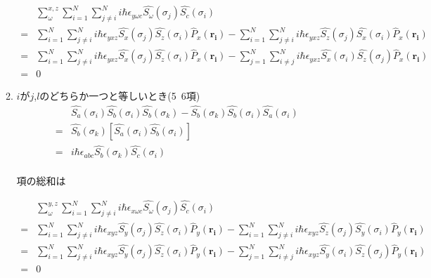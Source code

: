 \documentclass{article}
\begin{document}
\begin{enumerate}
\begin{enumerate}
\begin{equation}
\begin{split}
\label{}
&\sum_{\omega}^{x,z}\sum_{i=1}^{N} \sum_{j\neq i}^{N} i\hbar \epsilon_{y \omega c}\hat{S_{\omega}}{(\sigma_j)} \hat{S_c}(\sigma_i)\\  
=&\sum_{i=1}^{N} \sum_{j\neq i}^{N} i\hbar \epsilon_{y xz}\hat{S_{x}}{(\sigma_j)} \hat{S_z}(\sigma_i) {\hat{P}_x}{(\boldsymbol{r_i})} - \sum_{i=1}^{N} \sum_{j\neq i}^{N} i\hbar \epsilon_{yxz}\hat{S_{z}}{(\sigma_j)} \hat{S_x}(\sigma_i) {\hat{P}_x}{(\boldsymbol{r_i})}\\ 
=&\sum_{i=1}^{N} \sum_{j\neq i}^{N} i\hbar \epsilon_{yxz}\hat{S_{x}}{(\sigma_j)} \hat{S_z}(\sigma_i) {\hat{P}_x}{(\boldsymbol{r_i})} - \sum_{j=1}^{N} \sum_{i\neq j}^{N} i\hbar \epsilon_{yxz}\hat{S_{x}}{(\sigma_i)} \hat{S_z}(\sigma_j) {\hat{P}_x}{(\boldsymbol{r_i})}\\ 
=&0
\end{split}
\end{equation}

        \item  $i$が$j$,$l$のどちらか一つと等しいとき(5~6項)
        \begin{equation}
            \begin{split}
            \label{}
            &{\hat{S_a}}(\sigma_i) \hat{S_{b}}{(\sigma_i)} \hat{S_{b}}{(\sigma_k)} -  \hat{S_{b}}{(\sigma_k)} \hat{S_{b}}{(\sigma_i)} {\hat{S_a}}(\sigma_i)\\
           =& \hat{S_{b}}{(\sigma_k)} [\hat{S_a}(\sigma_i) \hat{S_{b}}{(\sigma_i)} ]\\  
           =& i\hbar \epsilon_{abc}\hat{S_{b}}{(\sigma_k)} \hat{S_c}(\sigma_i)\\  
        \end{split}
        \end{equation}
        
        項の総和は
        
        \begin{equation}
        \begin{split}
        \label{}
        &\sum_{\omega}^{y,z}\sum_{i=1}^{N} \sum_{j\neq i}^{N} i\hbar \epsilon_{x \omega c}\hat{S_{\omega}}{(\sigma_j)} \hat{S_c}(\sigma_i)\\  
        =&\sum_{i=1}^{N} \sum_{j\neq i}^{N} i\hbar \epsilon_{x yz}\hat{S_{y}}{(\sigma_j)} \hat{S_z}(\sigma_i){\hat{P}_y}{(\boldsymbol{r_i})} - \sum_{i=1}^{N} \sum_{j\neq i}^{N} i\hbar \epsilon_{xyz}\hat{S_{z}}{(\sigma_j)} \hat{S_y}(\sigma_i){\hat{P}_y}{(\boldsymbol{r_i})}\\ 
        =&\sum_{i=1}^{N} \sum_{j\neq i}^{N} i\hbar \epsilon_{x yz}\hat{S_{y}}{(\sigma_j)} \hat{S_z}(\sigma_i){\hat{P}_y}{(\boldsymbol{r_i})} - \sum_{j=1}^{N} \sum_{i\neq j}^{N} i\hbar \epsilon_{xyz}\hat{S_{y}}{(\sigma_i)} \hat{S_z}(\sigma_j){\hat{P}_y}{(\boldsymbol{r_i})}\\ 
        =&0
        \end{split}
        \end{equation}
        

\end{enumerate}
\end{enumerate}
\end{document}
